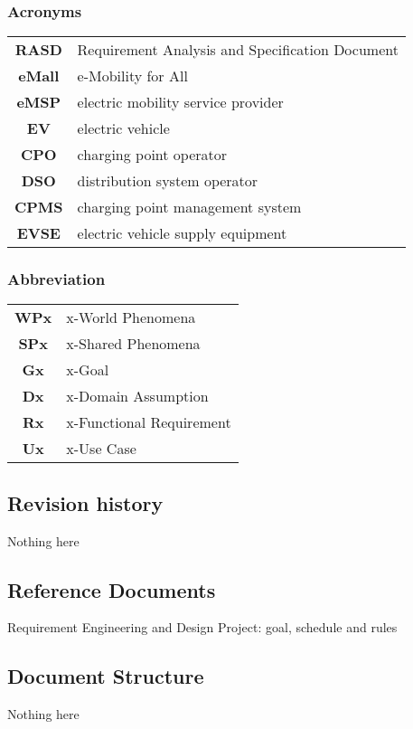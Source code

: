 \subsubsection*{Acronyms}
\begin{table}[H]
    \begin{tabularx}{\textwidth}{cX}
        \toprule
        \textbf{RASD}  & Requirement Analysis and Specification Document \\
        \textbf{eMall} & e-Mobility for All                              \\
        \textbf{eMSP}  & electric mobility service provider              \\
        \textbf{EV}    & electric vehicle                                \\
        \textbf{CPO}   & charging point operator                         \\
        \textbf{DSO}   & distribution system operator                    \\
        \textbf{CPMS}  & charging point management system                \\
        \textbf{EVSE}  & electric vehicle supply equipment               \\ \bottomrule
    \end{tabularx}
\end{table}
\subsubsection*{Abbreviation}
\begin{table}[H]
    \begin{tabularx}{\textwidth}{cX}
        \toprule
        \textbf{WPx} & x-World Phenomena        \\
        \textbf{SPx} & x-Shared Phenomena       \\
        \textbf{Gx}  & x-Goal                   \\
        \textbf{Dx}  & x-Domain Assumption      \\
        \textbf{Rx}  & x-Functional Requirement \\
        \textbf{Ux}  & x-Use Case               \\ \bottomrule
    \end{tabularx}
\end{table}
\subsection{Revision history}
Nothing here

\subsection{Reference Documents}
Requirement Engineering and Design Project: goal, schedule and rules


\subsection{Document Structure}
Nothing here
